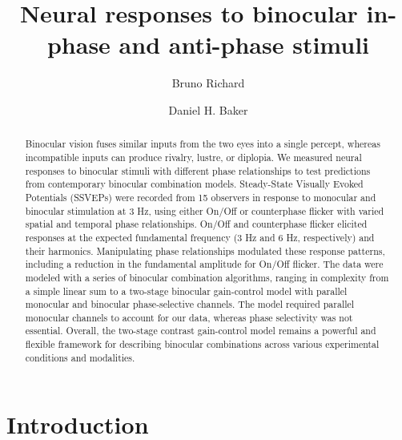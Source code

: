 \documentclass[
  12pt,
]{article}
\title{Neural responses to binocular in-phase and anti-phase stimuli}
\author[1]{Bruno Richard}
\author[2]{Daniel H. Baker}
\affil[1]{Department of Math and Computer Sciences, Rutgers
University, Newark, New Jersey, USA}
\affil[2]{Department of Psychology, University of York, York, UK}
\date{}
\begin{document}
\maketitle
\begin{abstract}
Binocular vision fuses similar inputs from the two eyes into a single
percept, whereas incompatible inputs can produce rivalry, lustre, or
diplopia. We measured neural responses to binocular stimuli with
different phase relationships to test predictions from contemporary
binocular combination models. Steady-State Visually Evoked Potentials
(SSVEPs) were recorded from 15 observers in response to monocular and
binocular stimulation at 3 Hz, using either On/Off or counterphase
flicker with varied spatial and temporal phase relationships. On/Off and
counterphase flicker elicited responses at the expected fundamental
frequency (3 Hz and 6 Hz, respectively) and their harmonics.
Manipulating phase relationships modulated these response patterns,
including a reduction in the fundamental amplitude for On/Off flicker.
The data were modeled with a series of binocular combination algorithms,
ranging in complexity from a simple linear sum to a two-stage binocular
gain-control model with parallel monocular and binocular phase-selective
channels. The model required parallel monocular channels to account for
our data, whereas phase selectivity was not essential. Overall, the
two-stage contrast gain-control model remains a powerful and flexible
framework for describing binocular combinations across various
experimental conditions and modalities.
\end{abstract}


\section{Introduction}\label{introduction}
\end{document}
